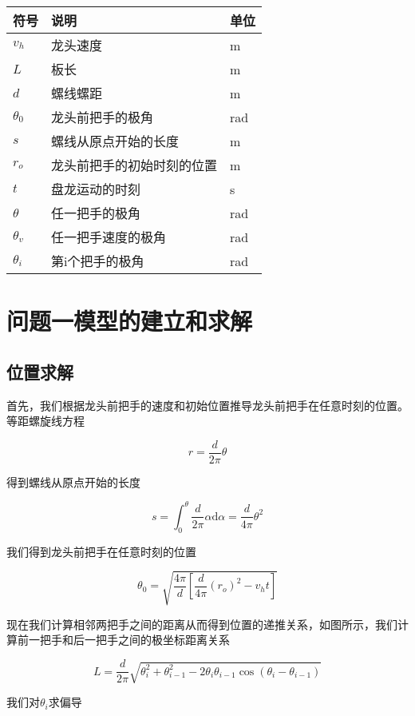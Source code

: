 \documentclass[withoutpreface,bwprint]{cumcmthesis} %
\begin{document}
\begin{table}[H]
    \centering
    \begin{tabularx}{\linewidth}{lXl} 
    \toprule
    符号 & 说明 & 单位 \\
    \midrule
    $v_h$ & 龙头速度 & m \\
    $L$ & 板长 & m \\
    $d$ & 螺线螺距 & m \\
    $\theta_0$ & 龙头前把手的极角 & rad \\
    $s$ & 螺线从原点开始的长度& m \\
    $r_o$ & 龙头前把手的初始时刻的位置 & m\\ 
    $t$ & 盘龙运动的时刻 & s \\
    $\theta$ & 任一把手的极角 & rad\\
    $\theta_v$ & 任一把手速度的极角 & rad \\
    $\theta_i$ & 第i个把手的极角 & rad \\
    \bottomrule
    \end{tabularx}
    \end{table}

\section{问题一模型的建立和求解}

\subsection{位置求解}

首先，我们根据龙头前把手的速度和初始位置推导龙头前把手在任意时刻的位置。等距螺旋线方程

$$
    r = \frac d {2\pi} \theta 
$$

得到螺线从原点开始的长度 

$$
    s = \int_0^{\theta} \frac{d}{2\pi} \alpha \mathrm d \alpha = \frac d {4\pi} \theta^2
$$

我们得到龙头前把手在任意时刻的位置

$$
    \theta_0 = \sqrt{\frac{4\pi}{d}\left[\frac{d}{4\pi}\left(r_o\right)^2-v_h t\right]}
$$

现在我们计算相邻两把手之间的距离从而得到位置的递推关系，如图所示，我们计算前一把手和后一把手之间的极坐标距离关系

$$
    L = \frac d {2\pi} \sqrt {\theta_i^2 + \theta_{i-1}^2  - 2\theta_{i}\theta_{i-1}\cos(\theta_i-\theta_{i-1})}
$$

我们对$\theta_i$求偏导
\end{document}
